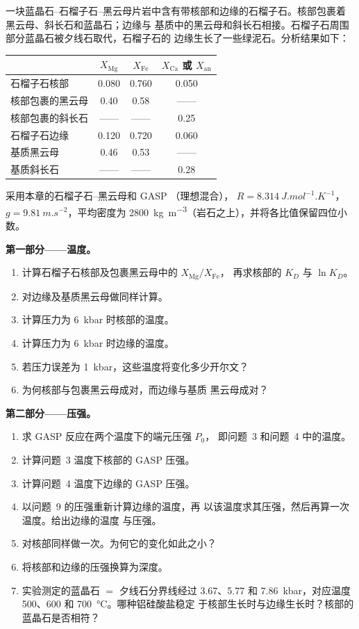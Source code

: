 \begin{problem}
\label{pb:b2:pt-paths:1}
一块蓝晶石–石榴子石–黑云母片岩中含有带核部和边缘的石榴子石。核部包裹着
黑云母、斜长石和蓝晶石；边缘与
基质中的黑云母和斜长石相接。石榴子石周围部分蓝晶石被夕线石取代，石榴子石的
边缘生长了一些绿泥石。分析结果如下：
\begin{center}
\small
\begin{tabular}{@{}lccc@{}}
\hline
 & $X_{\text{Mg}}$ & $X_{\text{Fe}}$ & $X_{\text{Ca}}$ 或 $X_{\text{an}}$\\
\hline
石榴子石核部 & 0.080 & 0.760 & 0.050\\
核部包裹的黑云母 & 0.40 & 0.58 &——\\
核部包裹的斜长石 &——&——& 0.25\\
石榴子石边缘 & 0.120 & 0.720 & 0.060\\
基质黑云母 & 0.46 & 0.53 &——\\
基质斜长石 &——&——& 0.28\\
\hline
\end{tabular}
\end{center}
采用本章的石榴子石–黑云母和 GASP （理想混合），
$R = \qty{8.314}{J.mol^{-1}.K^{-1}}$，$g = \qty{9.81}{m.s^{-2}}$，平均密度为
\qty{2800}{kg.m^{-3}}（岩石之上），并将各比值保留四位小数。

\noindent\textbf{第一部分——温度。}
\begin{enumerate}
\item 计算石榴子石核部及包裹黑云母中的 $X_{\text{Mg}}/X_{\text{Fe}}$，
再求核部的 $K_D$ 与 $\ln K_D$。
\item 对边缘及基质黑云母做同样计算。
\item 计算压力为 \qty{6}{kbar} 时核部的温度。
\item 计算压力为 \qty{6}{kbar} 时边缘的温度。
\item 若压力误差为 \qty{1}{kbar}，这些温度将变化多少开尔文？
\item 为何核部与包裹黑云母成对，而边缘与基质
黑云母成对？
\end{enumerate}

\noindent\textbf{第二部分——压强。}
\begin{enumerate}[resume]
\item 求 GASP 反应在两个温度下的端元压强 $P_0$，
即问题~3 和问题~4 中的温度。
\item 计算问题~3 温度下核部的 GASP 压强。
\item 计算问题~4 温度下边缘的 GASP 压强。
\item 以问题~9 的压强重新计算边缘的温度，再
以该温度求其压强，然后再算一次温度。给出边缘的温度
与压强。
\item 对核部同样做一次。为何它的变化如此之小？
\item 将核部和边缘的压强换算为深度。
\item 实验测定的蓝晶石 $=$ 夕线石分界线经过 3.67、5.77 和
\qty{7.86}{kbar}，对应温度 500、600 和 \qty{700}{\celsius}。哪种铝硅酸盐稳定
于核部生长时与边缘生长时？核部的蓝晶石是否相符？
\end{enumerate}


\end{problem}
